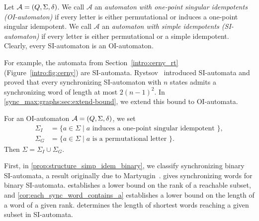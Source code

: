 
 
 
Let $\mathcal A = (Q, \Sigma, \delta)$.
We call $\mathcal A$ an \emph{automaton with one-point singular idempotents (OI-automaton)}
if every letter is either permutational or induces a one-point singular idempotent.
We call $\mathcal A$ an \emph{automaton with simple idempotents (SI-automaton)}
if every letter is either permutational or a simple idempotent.
Clearly, every SI-automaton is an OI-automaton.

For example, the \Cerny automata from
Section~\ref{intro:cerny_rt} (Figure~\ref{intro:fig:cerny})
are SI-automata.
Rystsov~\cite{Rystsov2000} introduced SI-automata and proved that
every synchronizing SI-automaton with $n$ states admits a synchronizing
word of length at most $2(n-1)^2$.
In \cref{sync_max:graphs:sec:extend-bound}, we extend this bound to OI-automata.

For an OI-automaton  $\mathcal A = (Q, \Sigma, \delta)$, we set \label{def:subalphabets_SI}
\begin{align*} 
	\Sigma_I & = \{ a \in \Sigma \mid a \text{ induces a one-point singular idempotent } \}, \\
	\Sigma_G & = \{ a \in \Sigma \mid a \text{ is a permutational letter } \}.
\end{align*} 
Then $\Sigma = \Sigma_I \cup \Sigma_G$. 

First, in
\cref{prop:structure_simp_idem_binary},
we classify synchronizing binary SI-automata, a result originally
due to Martyugin~\cite[Prop.~6.2]{Mar2009b}.
 gives synchronizing words for
binary SI-automata.
 establishes a lower bound on the rank
of a reachable subset, and
\cref{cor:each_sync_word_contains_a} establishes a lower bound on the
length of a word of a given rank.
 determines the length of shortest
words reaching a given subset in SI-automata.

